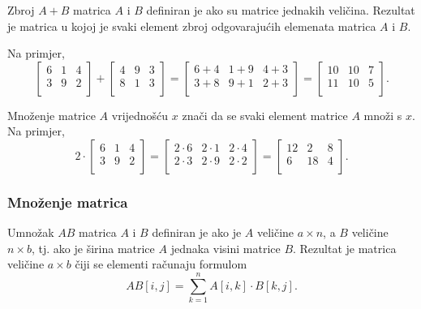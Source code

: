 Zbroj $A+B$ matrica $A$ i $B$
definiran je ako su matrice jednakih veličina.
Rezultat je matrica u kojoj je svaki element
zbroj odgovarajućih elemenata
matrica $A$ i $B$.

Na primjer,
\[
 \begin{bmatrix}
  6 & 1 & 4 \\
  3 & 9 & 2 \\
 \end{bmatrix}
+
 \begin{bmatrix}
  4 & 9 & 3 \\
  8 & 1 & 3 \\
 \end{bmatrix}
=
 \begin{bmatrix}
  6+4 & 1+9 & 4+3 \\
  3+8 & 9+1 & 2+3 \\
 \end{bmatrix}
=
 \begin{bmatrix}
  10 & 10 & 7 \\
  11 & 10 & 5 \\
 \end{bmatrix}.
\]

Množenje matrice $A$ vrijednošću $x$ znači
da se svaki element matrice $A$ množi s $x$.
Na primjer,
\[
 2 \cdot \begin{bmatrix}
  6 & 1 & 4 \\
  3 & 9 & 2 \\
 \end{bmatrix}
=
 \begin{bmatrix}
  2 \cdot 6 & 2\cdot1 & 2\cdot4 \\
  2\cdot3 & 2\cdot9 & 2\cdot2 \\
 \end{bmatrix}
=
 \begin{bmatrix}
  12 & 2 & 8 \\
  6 & 18 & 4 \\
 \end{bmatrix}.
\]

\subsubsection{Množenje matrica}


Umnožak $AB$ matrica $A$ i $B$
definiran je ako je $A$ veličine $a \times n$,
a $B$ veličine $n \times b$, tj.
ako je širina matrice $A$ jednaka visini matrice $B$.
Rezultat je matrica veličine $a \times b$
čiji se elementi računaju formulom
\[
AB[i,j] = \sum_{k=1}^n A[i,k] \cdot B[k,j].
\]

